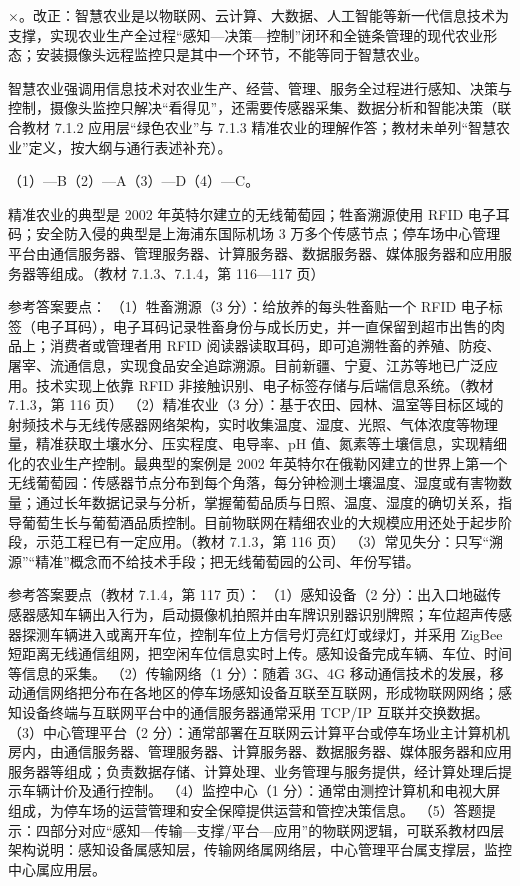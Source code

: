 \documentclass[a4paper,11pt]{article}
\begin{document}
\q ×。改正：智慧农业是以物联网、云计算、大数据、人工智能等新一代信息技术为支撑，实现农业生产全过程“感知—决策—控制”闭环和全链条管理的现代农业形态；安装摄像头远程监控只是其中一个环节，不能等同于智慧农业。\begin{analysis}智慧农业强调用信息技术对农业生产、经营、管理、服务全过程进行感知、决策与控制，摄像头监控只解决“看得见”，还需要传感器采集、数据分析和智能决策（联合教材 7.1.2 应用层“绿色农业”与 7.1.3 精准农业的理解作答；教材未单列“智慧农业”定义，按大纲与通行表述补充）。\end{analysis}


\q （1）—B\quad （2）—A\quad （3）—D\quad （4）—C。
\begin{analysis}精准农业的典型是 2002 年英特尔建立的无线葡萄园；牲畜溯源使用 RFID 电子耳码；安全防入侵的典型是上海浦东国际机场 3 万多个传感节点；停车场中心管理平台由通信服务器、管理服务器、计算服务器、数据服务器、媒体服务器和应用服务器等组成。（教材 7.1.3、7.1.4，第 116—117 页）\end{analysis}


\q 参考答案要点：
（1）牲畜溯源（3 分）：给放养的每头牲畜贴一个 RFID 电子标签（电子耳码），电子耳码记录牲畜身份与成长历史，并一直保留到超市出售的肉品上；消费者或管理者用 RFID 阅读器读取耳码，即可追溯牲畜的养殖、防疫、屠宰、流通信息，实现食品安全追踪溯源。目前新疆、宁夏、江苏等地已广泛应用。技术实现上依靠 RFID 非接触识别、电子标签存储与后端信息系统。（教材 7.1.3，第 116 页）
（2）精准农业（3 分）：基于农田、园林、温室等目标区域的射频技术与无线传感器网络架构，实时收集温度、湿度、光照、气体浓度等物理量，精准获取土壤水分、压实程度、电导率、pH 值、氮素等土壤信息，实现精细化的农业生产控制。最典型的案例是 2002 年英特尔在俄勒冈建立的世界上第一个无线葡萄园：传感器节点分布到每个角落，每分钟检测土壤温度、湿度或有害物数量；通过长年数据记录与分析，掌握葡萄品质与日照、温度、湿度的确切关系，指导葡萄生长与葡萄酒品质控制。目前物联网在精细农业的大规模应用还处于起步阶段，示范工程已有一定应用。（教材 7.1.3，第 116 页）
（3）常见失分：只写“溯源”“精准”概念而不给技术手段；把无线葡萄园的公司、年份写错。

\q 参考答案要点（教材 7.1.4，第 117 页）：
（1）感知设备（2 分）：出入口地磁传感器感知车辆出入行为，启动摄像机拍照并由车牌识别器识别牌照；车位超声传感器探测车辆进入或离开车位，控制车位上方信号灯亮红灯或绿灯，并采用 ZigBee 短距离无线通信组网，把空闲车位信息实时上传。感知设备完成车辆、车位、时间等信息的采集。
（2）传输网络（1 分）：随着 3G、4G 移动通信技术的发展，移动通信网络把分布在各地区的停车场感知设备互联至互联网，形成物联网网络；感知设备终端与互联网平台中的通信服务器通常采用 TCP/IP 互联并交换数据。
（3）中心管理平台（2 分）：通常部署在互联网云计算平台或停车场业主计算机机房内，由通信服务器、管理服务器、计算服务器、数据服务器、媒体服务器和应用服务器等组成；负责数据存储、计算处理、业务管理与服务提供，经计算处理后提示车辆计价及通行控制。
（4）监控中心（1 分）：通常由测控计算机和电视大屏组成，为停车场的运营管理和安全保障提供运营和管控决策信息。
（5）答题提示：四部分对应“感知—传输—支撑/平台—应用”的物联网逻辑，可联系教材四层架构说明：感知设备属感知层，传输网络属网络层，中心管理平台属支撑层，监控中心属应用层。
\end{document}
